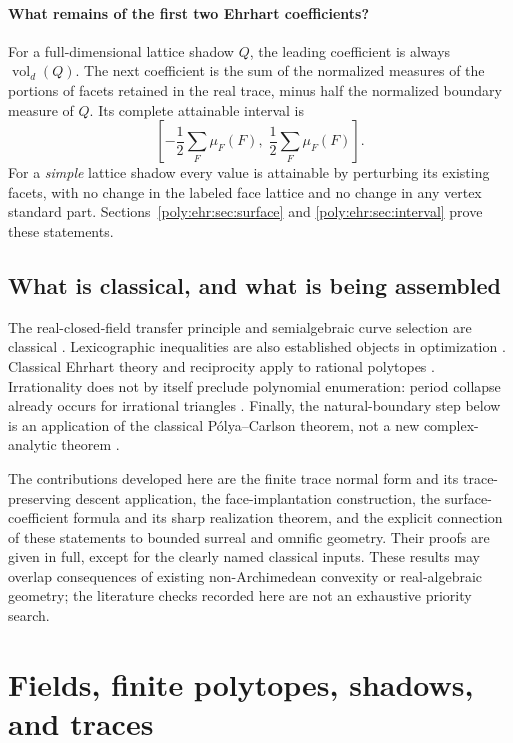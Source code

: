 \documentclass[11pt,a4paper]{article}
\numberwithin{equation}{section}
\theoremstyle{plain}
\newcommand{\vol}{\operatorname{vol}}
\begin{document}
\paragraph{What remains of the first two Ehrhart coefficients?}
For a full-dimensional lattice shadow $Q$, the leading coefficient is always
$\vol_d(Q)$. The next coefficient is the sum of the normalized measures of
the portions of facets retained in the real trace, minus half the normalized
boundary measure of $Q$. Its complete attainable interval is
\[
 \left[-\frac12\sum_F\mu_F(F),\;
        \frac12\sum_F\mu_F(F)\right].
\]
For a \emph{simple} lattice shadow every value is attainable by perturbing its
existing facets, with no change in the labeled face lattice and no change in
any vertex standard part. Sections~\ref{poly:ehr:sec:surface} and \ref{poly:ehr:sec:interval}
prove these statements.

\subsection{What is classical, and what is being assembled}

The real-closed-field transfer principle and semialgebraic curve selection
are classical \cite{ehr:bpr,ehr:basu-roy,ehr:fernando}. Lexicographic inequalities are
also established objects in optimization \cite{ehr:lex-cuts}. Classical Ehrhart
theory and reciprocity apply to rational polytopes \cite{ehr:sam-woods}.
Irrationality does not by itself preclude polynomial enumeration: period
collapse already occurs for irrational triangles \cite{ehr:cgls}. Finally,
the natural-boundary step below is an application of the classical
P\'olya--Carlson theorem, not a new complex-analytic theorem
\cite{ehr:bell-et-al}.

The contributions developed here are the finite trace normal form and its
trace-preserving descent application, the face-implantation construction,
the surface-coefficient formula and its sharp realization theorem, and the
explicit connection of these statements to bounded surreal and omnific
geometry. Their proofs are given in full, except for the clearly named
classical inputs. These results may overlap consequences of existing
non-Archimedean convexity or real-algebraic geometry; the literature checks
recorded here are not an exhaustive priority search.

\section{Fields, finite polytopes, shadows, and traces}\label{poly:ehr:sec:setup}
\end{document}
